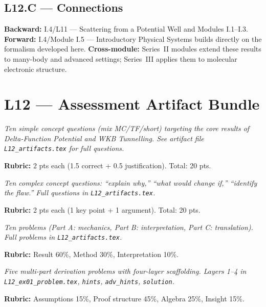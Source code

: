 \subsection*{L12.C — Connections}
\label{sec:L12.C}
\textbf{Backward:} I.4/L11 — Scattering from a Potential Well and Modules I.1–I.3.
\textbf{Forward:} I.4/Module I.5 — Introductory Physical Systems builds directly on the formalism developed here.
\textbf{Cross-module:} Series~II modules extend these results to many-body and
advanced settings; Series~III applies them to molecular electronic structure.

\newpage
\section*{L12 — Assessment Artifact Bundle}

\begin{tcolorbox}[ugconceptbox, title={SCQU · L12 · Tiers 1–3 · 15–20 min}]
\textit{Ten simple concept questions (mix MC/TF/short) targeting the core results
of Delta-Function Potential and WKB Tunnelling. See artifact file \texttt{L12_artifacts.tex} for full questions.}

\textbf{Rubric:} 2 pts each (1.5 correct + 0.5 justification). Total: 20 pts.
\end{tcolorbox}

\begin{tcolorbox}[ugconceptbox, title={CCQU · L12 · Tiers 2–3 · 25–35 min}]
\textit{Ten complex concept questions: ``explain why,'' ``what would change if,''
``identify the flaw.'' Full questions in \texttt{L12_artifacts.tex}.}

\textbf{Rubric:} 2 pts each (1 key point + 1 argument). Total: 20 pts.
\end{tcolorbox}

\begin{tcolorbox}[ugprobbox, title={SPSU · L12 · Tiers 1–3 · 60–90 min}]
\textit{Ten problems (Part A: mechanics, Part B: interpretation, Part C: translation).
Full problems in \texttt{L12_artifacts.tex}.}

\textbf{Rubric:} Result 60\%, Method 30\%, Interpretation 10\%.
\end{tcolorbox}

\begin{tcolorbox}[ugprobbox, title={CPSU · L12 · Tier 3 · 3–6 hrs (4-layer)}]
\textit{Five multi-part derivation problems with four-layer scaffolding.
Layers 1–4 in \texttt{L12_ex01\_problem.tex}, \texttt{hints}, \texttt{adv\_hints}, \texttt{solution}.}

\textbf{Rubric:} Assumptions 15\%, Proof structure 45\%, Algebra 25\%, Insight 15\%.
\end{tcolorbox}

